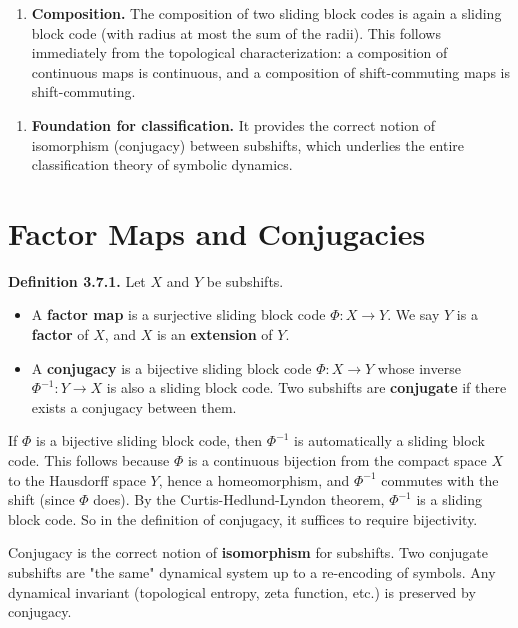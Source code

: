 \begin{enumerate}
\item \textbf{Composition.} The composition of two sliding block codes is again a sliding block code (with radius at most the sum of the radii). This follows immediately from the topological characterization: a composition of continuous maps is continuous, and a composition of shift-commuting maps is shift-commuting.
\end{enumerate}

\begin{enumerate}
\item \textbf{Foundation for classification.} It provides the correct notion of isomorphism (conjugacy) between subshifts, which underlies the entire classification theory of symbolic dynamics.
\end{enumerate}



\section{Factor Maps and Conjugacies}

\textbf{Definition 3.7.1.} Let $X$ and $Y$ be subshifts.

\begin{itemize}
\item A \textbf{factor map} is a surjective sliding block code $\Phi: X \to Y$. We say $Y$ is a \textbf{factor} of $X$, and $X$ is an \textbf{extension} of $Y$.
\end{itemize}

\begin{itemize}
\item A \textbf{conjugacy} is a bijective sliding block code $\Phi: X \to Y$ whose inverse $\Phi^{-1}: Y \to X$ is also a sliding block code. Two subshifts are \textbf{conjugate} if there exists a conjugacy between them.
\end{itemize}

\begin{remark}
If $\Phi$ is a bijective sliding block code, then $\Phi^{-1}$ is automatically a sliding block code. This follows because $\Phi$ is a continuous bijection from the compact space $X$ to the Hausdorff space $Y$, hence a homeomorphism, and $\Phi^{-1}$ commutes with the shift (since $\Phi$ does). By the Curtis-Hedlund-Lyndon theorem, $\Phi^{-1}$ is a sliding block code. So in the definition of conjugacy, it suffices to require bijectivity.

Conjugacy is the correct notion of \textbf{isomorphism} for subshifts. Two conjugate subshifts are "the same" dynamical system up to a re-encoding of symbols. Any dynamical invariant (topological entropy, zeta function, etc.) is preserved by conjugacy.
\end{remark}

